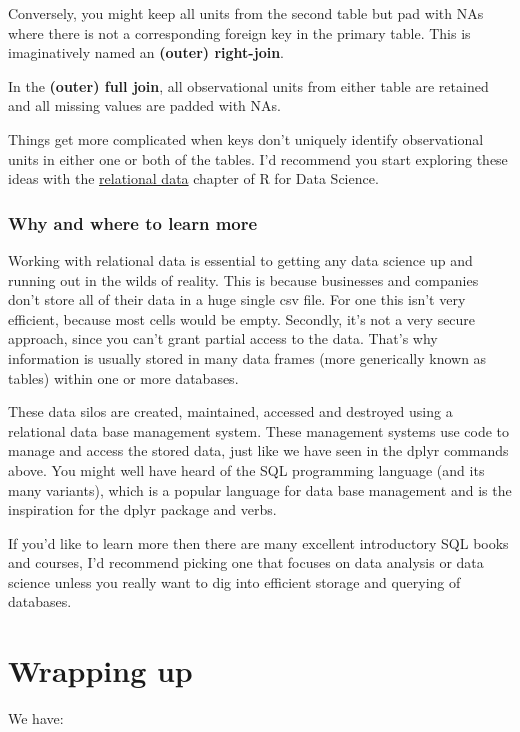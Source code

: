 \documentclass[
  letterpaper,
  DIV=11,
  numbers=noendperiod]{scrreprt}
\begin{document}
Conversely, you might keep all units from the second table but pad with
NAs where there is not a corresponding foreign key in the primary table.
This is imaginatively named an \textbf{(outer) right-join}.

In the \textbf{(outer) full join}, all observational units from either
table are retained and all missing values are padded with NAs.

Things get more complicated when keys don't uniquely identify
observational units in either one or both of the tables. I'd recommend
you start exploring these ideas with the
\href{https://r4ds.had.co.nz/relational-data.html}{relational data}
chapter of R for Data Science.

\subsubsection{Why and where to learn
more}\label{why-and-where-to-learn-more}

Working with relational data is essential to getting any data science up
and running out in the wilds of reality. This is because businesses and
companies don't store all of their data in a huge single csv file. For
one this isn't very efficient, because most cells would be empty.
Secondly, it's not a very secure approach, since you can't grant partial
access to the data. That's why information is usually stored in many
data frames (more generically known as tables) within one or more
databases.

These data silos are created, maintained, accessed and destroyed using a
relational data base management system. These management systems use
code to manage and access the stored data, just like we have seen in the
dplyr commands above. You might well have heard of the SQL programming
language (and its many variants), which is a popular language for data
base management and is the inspiration for the dplyr package and verbs.

If you'd like to learn more then there are many excellent introductory
SQL books and courses, I'd recommend picking one that focuses on data
analysis or data science unless you really want to dig into efficient
storage and querying of databases.

\section{Wrapping up}\label{wrapping-up-3}

We have:
\end{document}
